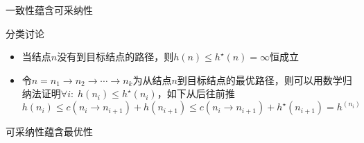 \begin{theorem}
一致性蕴含可采纳性
\end{theorem}
\begin{analysis}
分类讨论
\begin{itemize}
	\item 当结点$n$没有到目标结点的路径，则$h(n)\leq h^\star(n)=\infty$恒成立
	\item 令$n=n_1\to n_2\to\cdots\to n_k$为从结点$n$到目标结点的最优路径，则可以用数学归纳法证明$\forall i:\;h(n_i)\leq h^\star(n_i)$，如下从后往前推
	\[h(n_{i})\leq c(n_i\to n_{i+1})+h(n_{i+1})\leq c(n_i\to n_{i+1}) + h^\star(n_{i+1})=h^(n_i)\]
\end{itemize}
\end{analysis}

\begin{theorem}
可采纳性蕴含最优性
\end{theorem}
\begin{analysis}
\end{analysis}